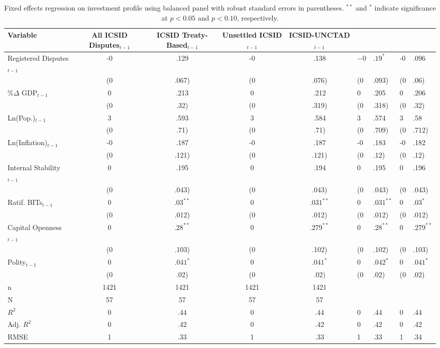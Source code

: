 \begin{table}[ht]
\centering
{\footnotesize
\begin{tabular}{lcccc}
 Variable & All ICSID Disputes$_{t-1}$ & ICSID Treaty-Based$_{t-1}$ & Unsettled ICSID$_{t-1}$ & ICSID-UNCTAD$_{t-1}$ \\ 
  \hline
\hline
Registered Disputes$_{t-1}$ & -0&.129 & -0&.138 & $-0$&$.19^{\ast}$ & -0&.096 \\ 
   & (0&.067) & (0&.076) & (0&.093) & (0&.06) \\ 
  \%$\Delta$ GDP$_{t-1}$ & 0&.213 & 0&.212 & 0&.205 & 0&.206 \\ 
   & (0&.32) & (0&.319) & (0&.318) & (0&.32) \\ 
  Ln(Pop.)$_{t-1}$ & 3&.593 & 3&.584 & 3&.574 & 3&.58 \\ 
   & (0&.71) & (0&.71) & (0&.709) & (0&.712) \\ 
  Ln(Inflation)$_{t-1}$ & -0&.187 & -0&.187 & -0&.183 & -0&.182 \\ 
   & (0&.121) & (0&.121) & (0&.12) & (0&.12) \\ 
  Internal Stability$_{t-1}$ & 0&.195 & 0&.194 & 0&.195 & 0&.196 \\ 
   & (0&.043) & (0&.043) & (0&.043) & (0&.043) \\ 
  Ratif. BITs$_{t-1}$ & $0$&$.03^{\ast\ast}$ & $0$&$.031^{\ast\ast}$ & $0$&$.031^{\ast\ast}$ & $0$&$.03^{\ast}$ \\ 
   & (0&.012) & (0&.012) & (0&.012) & (0&.012) \\ 
  Capital Openness$_{t-1}$ & $0$&$.28^{\ast\ast}$ & $0$&$.279^{\ast\ast}$ & $0$&$.28^{\ast\ast}$ & $0$&$.279^{\ast\ast}$ \\ 
   & (0&.103) & (0&.102) & (0&.102) & (0&.103) \\ 
  Polity$_{t-1}$ & $0$&$.041^{\ast}$ & $0$&$.041^{\ast}$ & $0$&$.042^{\ast}$ & $0$&$.041^{\ast}$ \\ 
   & (0&.02) & (0&.02) & (0&.02) & (0&.02) \\ 
   \hline
n & 1421 & 1421 & 1421 & 1421 \\ 
  N & 57 & 57 & 57 & 57 \\ 
  $R^{2}$ & 0&.44 & 0&.44 & 0&.44 & 0&.44 \\ 
  Adj. $R^{2}$ & 0&.42 & 0&.42 & 0&.42 & 0&.42 \\ 
  RMSE & 1&.33 & 1&.33 & 1&.33 & 1&.34 \\ 
   \hline
\hline
\end{tabular}
}
\caption{Fixed effects regression on investment profile using balanced panel with robust standard errors in parentheses. $^{**}$ and $^{*}$ indicate significance at $p< 0.05 $ and $p< 0.10 $, respectively.} 
\end{table}
